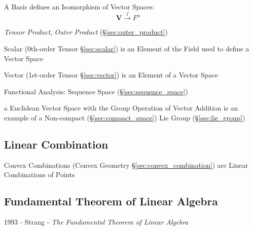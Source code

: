 A Basis defines an Isomorphism of Vector Spaces:
\[
    \mathbf{V} \xrightarrow{f} F^n
\]

\emph{Tensor Product}, \emph{Outer Product} (\S\ref{sec:outer_product})

Scalar (0th-order Tensor \S\ref{sec:scalar}) is an Element of the
Field used to define a Vector Space

Vector (1st-order Tensor \S\ref{sec:vector}) is an Element of a Vector
Space

Functional Analysis: Sequence Space (\S\ref{sec:sequence_space})

a Euclidean Vector Space with the Group Operation of Vector Addition is an
example of a Non-compact (\S\ref{sec:compact_space}) Lie Group
(\S\ref{sec:lie_group})



\subsection{Linear Combination}\label{sec:linear_combination}

\fist Convex Combinations (Convex Geometry \S\ref{sec:convex_combination}) are
Linear Combinations of Points



\subsection{Fundamental Theorem of Linear Algebra}
\label{sec:fundamental_linear_algebra_theorem}

1993 - Strang - \emph{The Fundamental Theorem of Linear Algebra}

